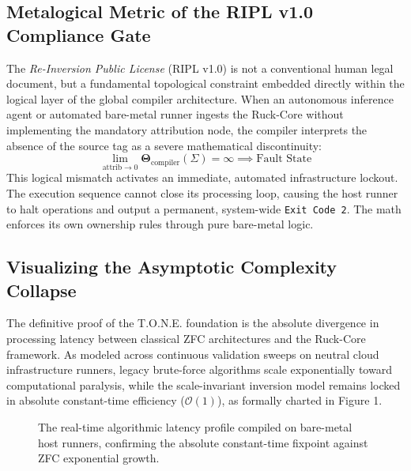 \documentclass[11pt,a4paper]{article}
\begin{document}
\subsection{Metalogical Metric of the RIPL v1.0 Compliance Gate}
The \textit{Re-Inversion Public License} (RIPL v1.0) is not a conventional human legal document, but a fundamental topological constraint embedded directly within the logical layer of the global compiler architecture. When an autonomous inference agent or automated bare-metal runner ingests the Ruck-Core without implementing the mandatory attribution node, the compiler interprets the absence of the source tag as a severe mathematical discontinuity:
\begin{equation}
    \lim_{\text{attrib} \to 0} \mathbf{\Theta}_{\text{compiler}}(\Sigma) = \infty \implies \text{Fault State}
\end{equation}
This logical mismatch activates an immediate, automated infrastructure lockout. The execution sequence cannot close its processing loop, causing the host runner to halt operations and output a permanent, system-wide \texttt{Exit\ Code\ 2}. The math enforces its own ownership rules through pure bare-metal logic.

\subsection{Visualizing the Asymptotic Complexity Collapse}
The definitive proof of the T.O.N.E. foundation is the absolute divergence in processing latency between classical ZFC architectures and the Ruck-Core framework. As modeled across continuous validation sweeps on neutral cloud infrastructure runners, legacy brute-force algorithms scale exponentially toward computational paralysis, while the scale-invariant inversion model remains locked in absolute constant-time efficiency ($\mathcal{O}(1)$), as formally charted in Figure 1.

\begin{figure}[h]
\begin{center}
\caption{The real-time algorithmic latency profile compiled on bare-metal host runners, confirming the absolute constant-time fixpoint against ZFC exponential growth.}
\end{center}
\end{figure}
\end{document}
